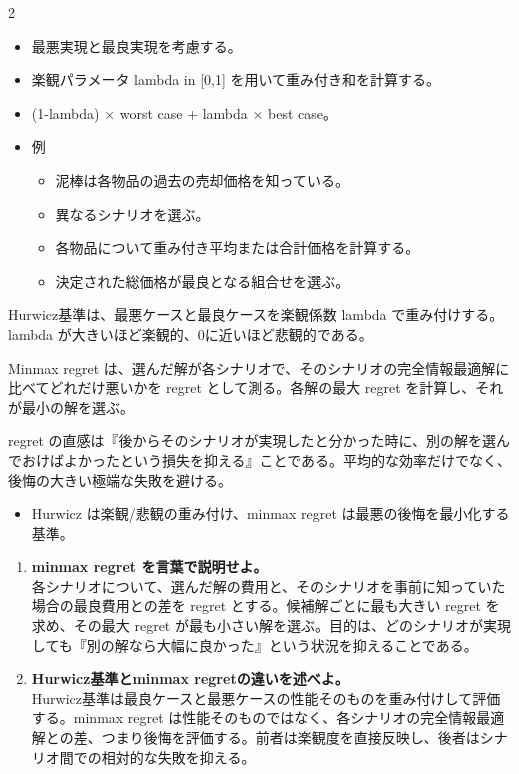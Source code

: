 \clearpage
{}
\begin{multicols}{2}\footnotesize\raggedcolumns
{}
\begin{itemize}
\item 最悪実現と最良実現を考慮する。
\item 楽観パラメータ lambda in [0,1] を用いて重み付き和を計算する。
\item (1-lambda) × worst case + lambda × best case。
\item 例
\begin{itemize}
\item 泥棒は各物品の過去の売却価格を知っている。
\item 異なるシナリオを選ぶ。
\item 各物品について重み付き平均または合計価格を計算する。
\item 決定された総価格が最良となる組合せを選ぶ。
\end{itemize}
\end{itemize}
Hurwicz基準は、最悪ケースと最良ケースを楽観係数 lambda で重み付けする。lambda が大きいほど楽観的、0に近いほど悲観的である。\par

Minmax regret は、選んだ解が各シナリオで、そのシナリオの完全情報最適解に比べてどれだけ悪いかを regret として測る。各解の最大 regret を計算し、それが最小の解を選ぶ。\par

regret の直感は『後からそのシナリオが実現したと分かった時に、別の解を選んでおけばよかったという損失を抑える』ことである。平均的な効率だけでなく、後悔の大きい極端な失敗を避ける。\par
{}
\begin{itemize}
\item Hurwicz は楽観/悲観の重み付け、minmax regret は最悪の後悔を最小化する基準。
\end{itemize}
\begin{enumerate}
\item \textbf{minmax regret を言葉で説明せよ。}\\各シナリオについて、選んだ解の費用と、そのシナリオを事前に知っていた場合の最良費用との差を regret とする。候補解ごとに最も大きい regret を求め、その最大 regret が最も小さい解を選ぶ。目的は、どのシナリオが実現しても『別の解なら大幅に良かった』という状況を抑えることである。
\item \textbf{Hurwicz基準とminmax regretの違いを述べよ。}\\Hurwicz基準は最良ケースと最悪ケースの性能そのものを重み付けして評価する。minmax regret は性能そのものではなく、各シナリオの完全情報最適解との差、つまり後悔を評価する。前者は楽観度を直接反映し、後者はシナリオ間での相対的な失敗を抑える。
\end{enumerate}
\end{multicols}

